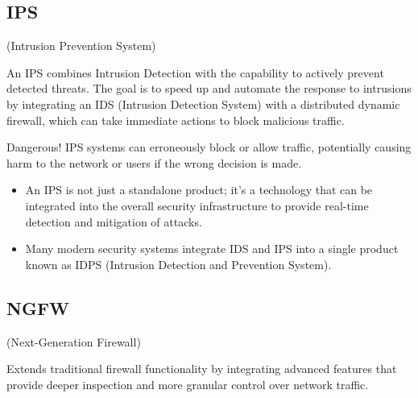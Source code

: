 \subsection{IPS}
\begin{center}
    (Intrusion Prevention System)
\end{center}

An IPS combines Intrusion Detection with the capability to actively prevent detected threats. The goal is to speed up and automate the response to intrusions by integrating an IDS (Intrusion Detection System) with a distributed dynamic firewall, which can take immediate actions to block malicious traffic.

\begin{tcolorbox}[colback=red!10!white, colframe=red!70!black, coltitle=white, title=Beware]
Dangerous! IPS systems can erroneously block or allow traffic, potentially causing harm to the network or users if the wrong decision is made.
\end{tcolorbox}

\begin{itemize}
    \item An IPS is not just a standalone product; it's a technology that can be integrated into the overall security infrastructure to provide real-time detection and mitigation of attacks.
    \item Many modern security systems integrate IDS and IPS into a single product known as IDPS (Intrusion Detection and Prevention System).
\end{itemize}

\subsection{NGFW}
\begin{center}
    (Next-Generation Firewall)
\end{center}

Extends traditional firewall functionality by integrating advanced features that provide deeper inspection and more granular control over network traffic. 

